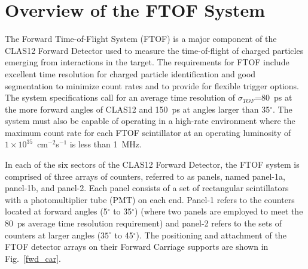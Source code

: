 \documentclass{elsart}
\begin{document}
\section{Overview of the FTOF System}
\label{sec:overview}

The Forward Time-of-Flight System (FTOF) is a major component of the CLAS12 Forward Detector
used to measure the time-of-flight of charged particles emerging from interactions in the target.
The requirements for FTOF include excellent time resolution for charged particle identification and
good segmentation to minimize count rates and to provide for flexible trigger options. The system
specifications call for an average time resolution of $\sigma_{TOF}$=80~ps at the more forward angles
of CLAS12 and 150~ps at angles larger than 35$^\circ$. The system must also be capable of operating
in a high-rate environment where the maximum count rate for each FTOF scintillator at an operating
luminosity of $1 \times 10^{35}$~cm$^{-2}$s$^{-1}$ is less than 1~MHz.

In each of the six sectors of the CLAS12 Forward Detector, the FTOF system is comprised of three
arrays of counters, referred to as panels, named panel-1a, panel-1b, and panel-2. Each panel consists
of a set of rectangular scintillators with a photomultiplier tube (PMT) on each end. Panel-1 refers to
the counters located at forward angles (5$^\circ$ to 35$^\circ$) (where two panels are employed to
meet the 80~ps average time resolution requirement) and panel-2 refers to the sets of counters at
larger angles ($35^\circ$ to 45$^\circ$). The positioning and attachment of the FTOF detector arrays
on their Forward Carriage supports are shown in Fig.~\ref{fwd_car}.
\end{document}
